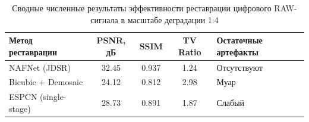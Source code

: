 \documentclass[12pt,a4paper,oneside]{article}
\begin{document}
\begin{table}[h]
\caption{Сводные численные результаты эффективности реставрации цифрового RAW-сигнала в масштабе деградации 1:4}
\label{tab:jdsr_metrics_final}
\centering
\begin{tabular}{l c c c l}  %
\toprule
\textbf{Метод реставрации} & \textbf{PSNR, дБ} & \textbf{SSIM} & \textbf{TV Ratio} & \textbf{Остаточные артефакты} \\
\midrule
NAFNet (JDSR) & 32.45 & 0.937 & 1.24 & Отсутствуют \\
Bicubic + Demosaic & 24.12 & 0.812 & 2.98 & Муар \\
ESPCN (single-stage) & 28.73 & 0.891 & 1.87 & Слабый \\
\bottomrule
\end{tabular}
\end{table}

\end{document}

